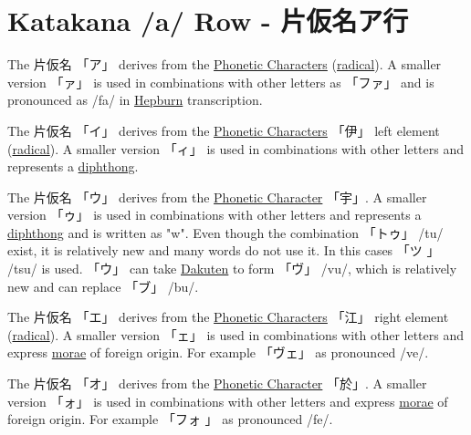 \section{Katakana /a/ Row -  片仮名ア行}\label{sec:KatakanaARow}


\label{letter:a} The 片仮名 {「ア」} derives from the
\hyperref[sec:PhoneticCharacter]{Phonetic Characters}
(\hyperref[sec:Radical]{radical}).  A smaller version {「ァ」} is used in
combinations with other letters as {「ファ」} and is pronounced as /fa/ in
\hyperref[sec:Hepburn]{Hepburn} transcription.

\label{letter:u} The 片仮名 {「イ」} derives from the
\hyperref[sec:PhoneticCharacter]{Phonetic Characters} {「伊」} left element
(\hyperref[sec:Radical]{radical}).  A smaller version {「ィ」} is used in
combinations with other letters and represents a
\hyperref[sec:Diphthong]{diphthong}. 

\label{letter:u} The 片仮名 {「ウ」} derives from the
\hyperref[sec:PhoneticCharacter]{Phonetic Character} {「宇」}. A smaller version
{「ゥ」} is used in combinations with other letters and represents a
\hyperref[sec:Diphthong]{diphthong} and is written as "w". Even though the
combination {「トゥ」} /tu/ exist, it is relatively new and many words do not
use it. In this cases {「ツ 」} /tsu/ is used. {「ウ」} can take
\hyperref[sec:Dakuten]{Dakuten} to form {「ヴ」} /vu/, which is relatively new
and can replace {「ブ」} /bu/. 



\newpage 

\label{letter:e} The 片仮名 {「エ」} derives from the
\hyperref[sec:PhoneticCharacter]{Phonetic Characters} {「江」} right element
(\hyperref[sec:Radical]{radical}). A smaller version {「ェ」} is used in
combinations with other letters and express \hyperref[sec:Mora]{morae} of
foreign origin. For example {「ヴェ」} as pronounced /ve/.

\label{letter:o} The 片仮名 {「オ」} derives from the
\hyperref[sec:PhoneticCharacter]{Phonetic Character} {「於」}. A smaller version
{「ォ」} is used in combinations with other letters and express
\hyperref[sec:Mora]{morae} of foreign origin. For example {「フォ 」} as
pronounced /fe/.

\newpage


